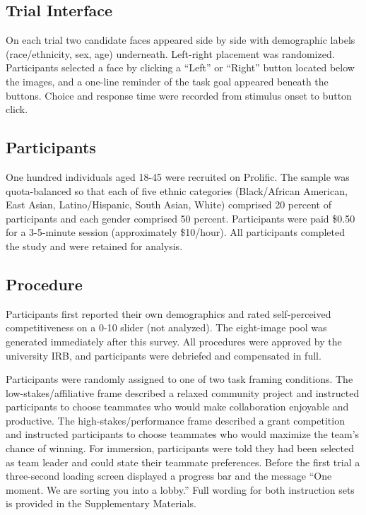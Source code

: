 \documentclass[
  man,
  floatsintext,
  longtable,
  nolmodern,
  notxfonts,
  notimes,
  draftfirst,
  colorlinks=true,linkcolor=blue,citecolor=blue,urlcolor=blue]{apa7}
\begin{document}
\subsection{Trial Interface}\label{trial-interface}

On each trial two candidate faces appeared side by side with demographic
labels (race/ethnicity, sex, age) underneath. Left-right placement was
randomized. Participants selected a face by clicking a ``Left'' or
``Right'' button located below the images, and a one-line reminder of
the task goal appeared beneath the buttons. Choice and response time
were recorded from stimulus onset to button click.

\subsection{Participants}\label{participants}

One hundred individuals aged 18-45 were recruited on Prolific. The
sample was quota-balanced so that each of five ethnic categories
(Black/African American, East Asian, Latino/Hispanic, South Asian,
White) comprised 20 percent of participants and each gender comprised 50
percent. Participants were paid \$0.50 for a 3-5-minute session
(approximately \$10/hour). All participants completed the study and were
retained for analysis.

\subsection{Procedure}\label{procedure}

Participants first reported their own demographics and rated
self-perceived competitiveness on a 0-10 slider (not analyzed). The
eight-image pool was generated immediately after this survey. All
procedures were approved by the university IRB, and participants were
debriefed and compensated in full.

Participants were randomly assigned to one of two task framing
conditions. The low-stakes/affiliative frame described a relaxed
community project and instructed participants to choose teammates who
would make collaboration enjoyable and productive. The
high-stakes/performance frame described a grant competition and
instructed participants to choose teammates who would maximize the
team's chance of winning. For immersion, participants were told they had
been selected as team leader and could state their teammate preferences.
Before the first trial a three-second loading screen displayed a
progress bar and the message ``One moment. We are sorting you into a
lobby.'' Full wording for both instruction sets is provided in the
Supplementary Materials.
\end{document}

